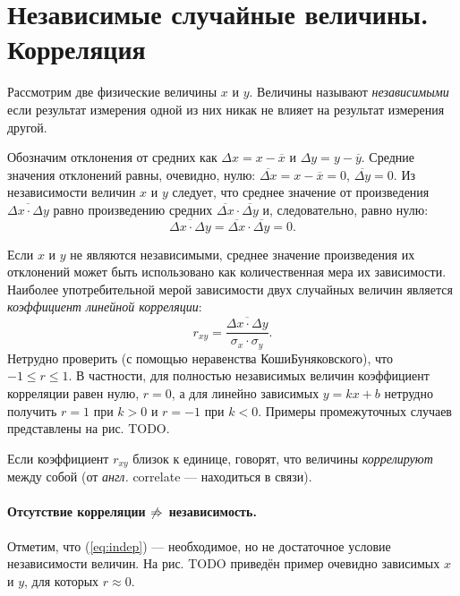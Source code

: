 
\section{Независимые случайные величины. Корреляция}

Рассмотрим две физические величины $x$ и $y$. Величины называют
\emph{независимыми} если результат измерения одной из них никак не
влияет на результат измерения другой.

Обозначим отклонения от средних как $\Delta x=x-\overline{x}$ и $\Delta y=y-\overline{y}$.
Средние значения отклонений равны, очевидно, нулю: $\overline{\Delta x}=x-\overline{x}=0$,
$\overline{\Delta y}=0$. Из независимости величин $x$ и $y$ следует,
что среднее значение от произведения $\overline{\Delta x\cdot\Delta y}$
равно произведению средних $\overline{\Delta x}\cdot\overline{\Delta y}$
и, следовательно, равно нулю: 
\begin{equation}
\overline{\Delta x\cdot\Delta y}=\overline{\Delta x}\cdot\overline{\Delta y}=0.\label{eq:indep}
\end{equation}

Если $x$ и $y$ не являются независимыми, среднее значение произведения
их отклонений может быть использовано как количественная мера их зависимости.
Наиболее употребительной мерой зависимости двух случайных величин
является \emph{коэффициент линейной корреляции}:
\begin{equation}
r_{xy}=\frac{\overline{\Delta x\cdot\Delta y}}{\sigma_{x}\cdot\sigma_{y}}.\label{eq:pearson}
\end{equation}
Нетрудно проверить (с помощью неравенства Коши\textendash Буняковского),
что $-1\le r\le1$. В частности, для полностью независимых величин
коэффициент корреляции равен нулю, $r=0$, а для линейно зависимых
$y=kx+b$ нетрудно получить $r=1$ при $k>0$ и $r=-1$ при $k<0$.
Примеры промежуточных случаев представлены на рис. TODO.

Если коэффициент $r_{xy}$ близок к единице, говорят, что величины
\emph{коррелируют} между собой (от \emph{англ.} correlate ---
находиться в связи).

\paragraph{Отсутствие корреляции $\protect\not\Rightarrow$ независимость.}

Отметим, что (\ref{eq:indep}) --- необходимое,
но не достаточное условие независимости величин. На рис. TODO приведён
пример очевидно зависимых $x$ и $y$, для которых $r\approx0$.

